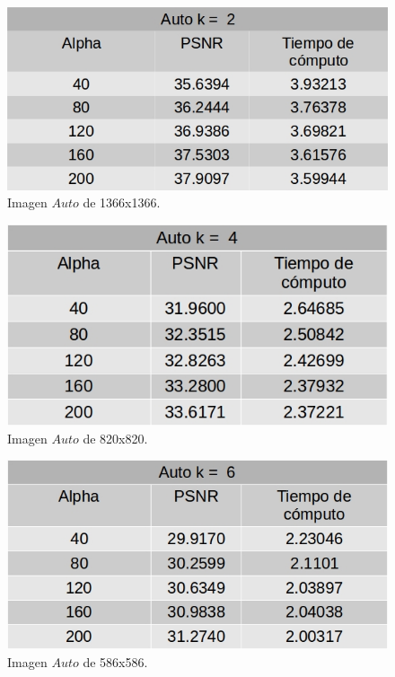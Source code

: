 \documentclass[a4paper]{article}
\begin{document}
    
    
    \begin{figure}[H]
    \centering
    \includegraphics[scale=0.4]{imagenes/auto2.jpg}
    \caption{Imagen $Auto$ de 1366x1366.}
	\label{autoe}
    \end{figure}

    \begin{figure}[H]
    \centering
    \includegraphics[scale=0.4]{imagenes/auto4.jpg}
    \caption{Imagen $Auto$ de 820x820.}
	\label{autoe}
    \end{figure}    
    
    \begin{figure}[H]
    \centering
    \includegraphics[scale=0.4]{imagenes/auto6.jpg}
    \caption{Imagen $Auto$ de 586x586.}
	\label{knnTasa2}
    \end{figure}
    
\end{document}

